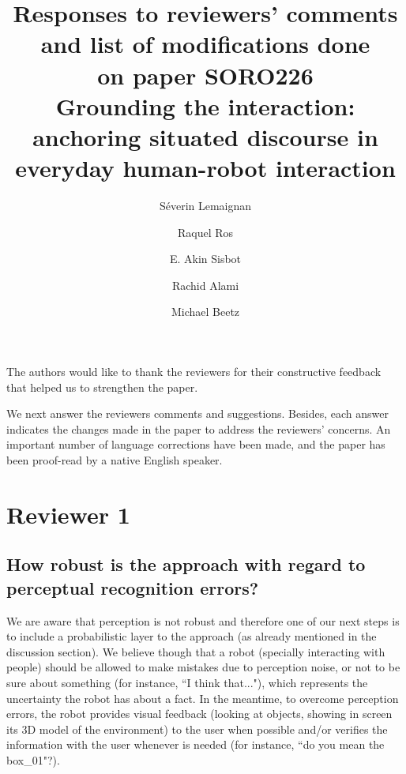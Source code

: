 \documentclass[11pt]{article}
\title{Responses to reviewers' comments and list of modifications done\\ on paper SORO226\\
\LARGE{\textbf{Grounding the interaction: anchoring situated discourse in everyday human-robot interaction}}}
\author{S\'everin Lemaignan \and Raquel Ros \and E. Akin Sisbot \and Rachid Alami \and Michael Beetz}
\begin{document}
\maketitle

The authors would like to thank the reviewers for their constructive feedback
that helped us to strengthen the paper.

We next answer the reviewers comments and suggestions. Besides, each answer
indicates the changes made in the paper to address the reviewers' concerns. An
important number of language corrections have been made, and the paper has been
proof-read by a native English speaker.




\section{Reviewer 1}

\subsection{How robust is the approach with regard to perceptual recognition
errors?}

We are aware that perception is not robust and therefore one of our next steps
is to include a probabilistic layer to the approach (as already mentioned in
the discussion section). We believe though that a robot (specially interacting
with people) should be allowed to make mistakes due to perception noise, or not
to be sure about something (for instance, ``I think that..."), which represents
the uncertainty the robot has about a fact. In the meantime, to overcome
perception errors, the robot provides visual feedback (looking at objects,
showing in screen its 3D model of the environment) to the user when possible
and/or verifies the information with the user whenever is needed (for instance,
``do you mean the box\_01"?). 
\end{document}
